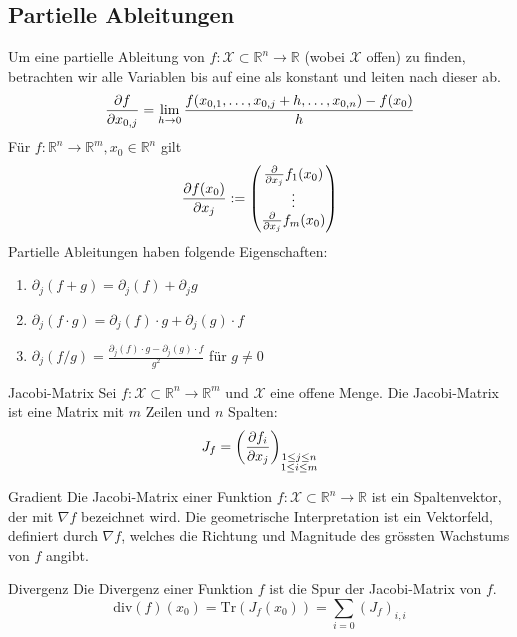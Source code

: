 \documentclass[a4paper,10pt]{article}
\def\R{\mathbb{R}}
\def\X{\mathcal{X}}
\begin{document}
\subsection{Partielle Ableitungen}
Um eine partielle Ableitung von \(f: \X \subset \R^n \to \R\) (wobei \(\X\) offen) zu finden, betrachten wir alle Variablen bis auf eine als konstant und leiten nach dieser ab.
\[\pdv{f}{x_{0,j}} = \lim_{h \to 0} \frac{f(x_{0,1}, \ldots, x_{0,j} + h, \ldots, x_{0,n}) - f(x_0)}{h}\]
Für \(f: \R^n \to \R^m, x_0 \in \R^n\) gilt
\begin{align*}
  \pdv{f(x_0)}{x_j} := \begin{pmatrix}
    \pdv*{f_1(x_0)}{x_j}\\
    \vdots\\
    \pdv*{f_m(x_0)}{x_j}\\
  \end{pmatrix}
\end{align*}
Partielle Ableitungen haben folgende Eigenschaften:
\begin{enumerate}
  \item \(\partial_j(f + g) = \partial_j (f) + \partial_j g\)
  \item \(\partial_j(f \cdot g) = \partial_j (f) \cdot g + \partial_j (g) \cdot f\)
  \item \(\partial_j(f / g) = \frac{\partial_j (f) \cdot g - \partial_j (g) \cdot f}{g^2}\) für \(g \ne 0\)
\end{enumerate}
\begin{mainbox}{Jacobi-Matrix}
Sei \(f: \X \subset \R^n \to \R^m\) und \(\X\) eine offene Menge. Die Jacobi-Matrix ist eine Matrix mit \(m\) Zeilen und \(n\) Spalten:
\[J_f = \left( \pdv{f_i}{x_j} \right)_{\substack{1 \leq j \leq n \\ 1 \leq i \leq m}}\]
\end{mainbox}
\begin{mainbox}{Gradient}
  Die Jacobi-Matrix einer Funktion \(f: \X \subset \R^n \to \R\) ist ein Spaltenvektor, der mit \(\nabla f\) bezeichnet wird. Die geometrische Interpretation ist ein Vektorfeld, definiert durch \(\nabla f\), welches die Richtung und Magnitude des grössten Wachstums von \(f\) angibt.
\end{mainbox}
\begin{subbox}{Divergenz}
  Die Divergenz einer Funktion \(f\) ist die Spur der Jacobi-Matrix von \(f\). \[\text{div}(f)(x_0) = \text{Tr}(J_f(x_0)) = \sum_{i=0}(J_f)_{i,i}\]
\end{subbox}
\end{document}
